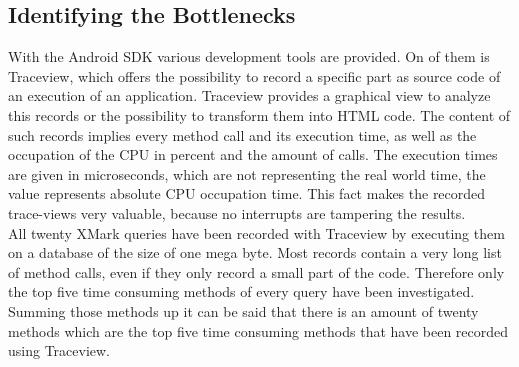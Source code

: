 \subsection{Identifying the Bottlenecks}
\label{sec:identifying-the-bottlenecks}
With the Android SDK various development tools are provided.
On of them is Traceview, which offers the possibility to record a specific part as source code of an execution of an application.
Traceview provides a graphical view to analyze this records or the possibility to transform them into HTML code.
The content of such records implies every method call and its execution time, as well as the occupation of the CPU in percent and the amount of calls.
The execution times are given in microseconds, which are not representing the real world time, the value represents absolute CPU occupation time.
This fact makes the recorded trace-views very valuable, because no interrupts are tampering the results.\\
All twenty XMark queries have been recorded with Traceview by executing them on a database of the size of one mega byte.
Most records contain a very long list of method calls, even if they only record a small part of the code.
Therefore only the top five time consuming methods of every query have been investigated.
Summing those methods up it can be said that there is an amount of twenty methods which are the top five time consuming methods that have been recorded using Traceview.
%
